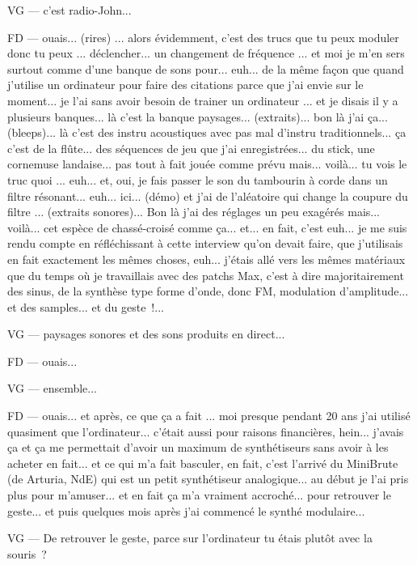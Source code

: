 VG — c'est radio-John... 

FD — ouais... (rires) ... alors évidemment, c'est des trucs que tu peux moduler donc tu peux ... déclencher... un changement de fréquence ... et moi je m'en sers surtout comme d'une banque de sons pour... euh... de la même façon que quand j'utilise un ordinateur pour faire des citations parce que j'ai envie sur le moment... je l'ai sans avoir besoin de trainer un ordinateur ... et je disais il y a plusieurs banques... là c'est la banque paysages... (extraits)... bon là j'ai ça... (bleeps)... là c'est des instru acoustiques avec pas mal d'instru traditionnels... ça c'est de la flûte... des séquences de jeu que j'ai enregistrées... du stick, une cornemuse landaise... pas tout à fait jouée comme prévu mais... voilà... tu vois le truc quoi ... euh... et, oui, je fais passer le son du tambourin à corde dans un filtre résonant... euh... ici... (démo) et j'ai de l'aléatoire qui change la coupure du filtre ... (extraits sonores)... Bon là j'ai des réglages un peu exagérés mais... voilà... cet espèce de chassé-croisé comme ça... et... en fait, c'est euh... je me suis rendu compte en réfléchissant à cette interview qu'on devait faire, que j'utilisais en fait exactement les mêmes choses, euh... j'étais allé vers les mêmes matériaux que du temps où je travaillais avec des patchs Max, c'est à dire majoritairement des sinus, de la synthèse type forme d'onde, donc FM, modulation d'amplitude... et des samples... et du geste !... 

VG — paysages sonores et des sons produits en direct... 

FD — ouais... 

VG — ensemble... 

FD — ouais... et après, ce que ça a fait ... moi presque pendant 20 ans j'ai utilisé quasiment que l'ordinateur... c'était aussi pour raisons financières, hein... j'avais ça et ça me permettait d'avoir un maximum de synthétiseurs sans avoir à les acheter en fait... et ce qui m'a fait basculer, en fait,  c'est l'arrivé du MiniBrute (de Arturia, NdE) qui est un petit synthétiseur analogique... au début je l'ai pris plus pour m'amuser... et en fait ça m'a vraiment accroché... pour retrouver le geste... et puis quelques mois après j'ai commencé le synthé modulaire... 

VG — De retrouver le geste, parce sur l'ordinateur tu étais plutôt avec la souris ? 

